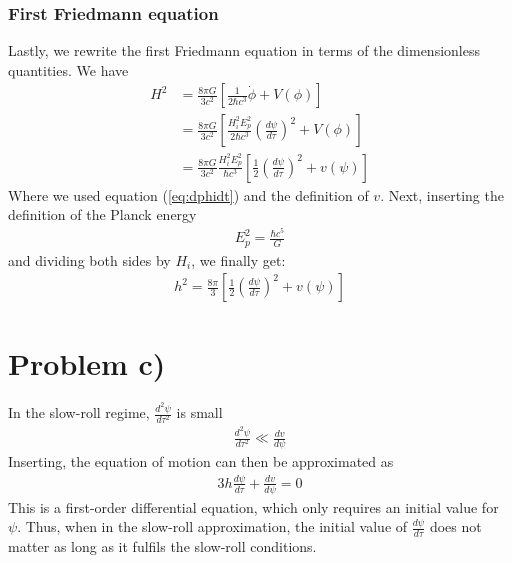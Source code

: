 \documentclass[reprint,english,notitlepage]{revtex4-1}  %
\numberwithin{equation}{section}
\begin{document}
\subsubsection{First Friedmann equation}
Lastly, we rewrite the first Friedmann equation in terms of the dimensionless quantities.
We have
\begin{align}
	H^2 &= \frac{8\pi G}{3 c^2}\left[ \frac{1}{2\hbar c^3}\dot{\phi} + V(\phi)\right] \\
			&= \frac{8\pi G}{3 c^2}\left[ \frac{H_i^2 E_p^2}{2\hbar c^3}\left(\frac{d\psi}{d\tau}\right)^2 + V(\phi)\right] \\
			&= \frac{8\pi G}{3 c^2}\frac{H_i^2 E_p^2}{\hbar c^3}\left[\frac{1}{2}\left(\frac{d\psi}{d\tau}\right)^2 + v(\psi)\right]
\end{align}
Where we used equation (\ref{eq:dphidt}) and the definition of $v$. Next,
inserting the definition of the Planck energy
\begin{align}
	E_p^2 = \frac{\hbar c^5}{G}
\end{align}
and dividing both sides by $H_i$, we finally get:
\begin{align}
	h^2 = \frac{8\pi}{3}\left[ \frac{1}{2}\left(\frac{d\psi}{d\tau}\right)^2 + v(\psi)\right] \label{eq:h}
\end{align}
\section{Problem c)}
In the slow-roll regime, $\frac{d^2\psi}{d\tau^2}$ is small
\begin{align}
	\frac{d^2\psi}{d\tau^2} \ll \frac{dv}{d\psi}
\end{align}
Inserting, the equation of motion can then be approximated as
\begin{align}
	3h\frac{d\psi}{d\tau} + \frac{dv}{d\psi} = 0
\end{align}
This is a first-order differential equation, which only requires an initial
value for $\psi$. Thus, when in the slow-roll approximation, the initial value
of $\frac{d\psi}{d\tau}$ does not matter as long as it fulfils the
slow-roll conditions.
\end{document}
